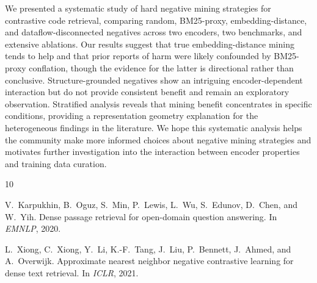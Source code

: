 \documentclass[11pt]{article}
\begin{document}
We presented a systematic study of hard negative mining strategies for contrastive code retrieval, comparing random, BM25-proxy, embedding-distance, and dataflow-disconnected negatives across two encoders, two benchmarks, and extensive ablations.
Our results suggest that true embedding-distance mining tends to help and that prior reports of harm were likely confounded by BM25-proxy conflation, though the evidence for the latter is directional rather than conclusive.
Structure-grounded negatives show an intriguing encoder-dependent interaction but do not provide consistent benefit and remain an exploratory observation.
Stratified analysis reveals that mining benefit concentrates in specific conditions, providing a representation geometry explanation for the heterogeneous findings in the literature.
We hope this systematic analysis helps the community make more informed choices about negative mining strategies and motivates further investigation into the interaction between encoder properties and training data curation.


\begin{thebibliography}{10}

V.~Karpukhin, B.~Oguz, S.~Min, P.~Lewis, L.~Wu, S.~Edunov, D.~Chen, and W.~Yih.
\newblock Dense passage retrieval for open-domain question answering.
\newblock In \emph{EMNLP}, 2020.

L.~Xiong, C.~Xiong, Y.~Li, K.-F.~Tang, J.~Liu, P.~Bennett, J.~Ahmed, and A.~Overwijk.
\newblock Approximate nearest neighbor negative contrastive learning for dense text retrieval.
\newblock In \emph{ICLR}, 2021.

\end{thebibliography}
\end{document}

